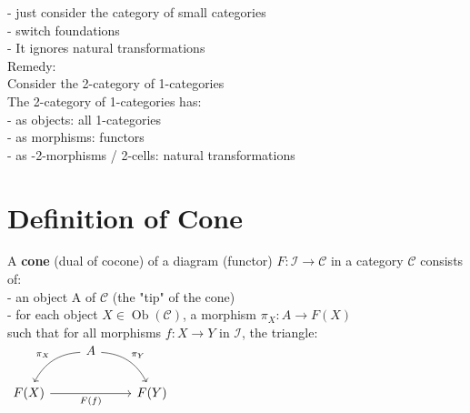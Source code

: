 \documentclass[a4paper, twoside, english, 11pt]{book}
\DeclareMathOperator{\Ob}{Ob}
\newcommand{\C}{\mathcal C}
\newcommand{\I}{\mathcal I}
\begin{document}
\indent\indent
- just consider the category of small categories \\

\indent\indent
- switch foundations \\

- It ignores natural transformations \\
\indent\indent
Remedy: \\
\indent\indent
Consider the 2-category of 1-categories \\

\indent\indent
The 2-category of 1-categories has: \\

\indent\indent\indent
- as objects: all 1-categories \\

\indent\indent\indent
- as morphisms: functors \\

\indent\indent\indent
- as -2-morphisms / 2-cells: natural transformations \\



\section{Definition of Cone}

A \textbf{cone} (dual of cocone) of a diagram (functor) $F : \I \rightarrow \C$ in a category $\C$ consists of: \\

- an object A of $\C$ (the "tip" of the cone) \\

- for each object $X \in \Ob(\C)$, a morphism $\pi_X : A \rightarrow F(X)$ \\

\noindent
such that for all morphisms $f: X \rightarrow Y$ in $\I$, the triangle: \\

$\begin{tikzcd}
                         & A \arrow[ld, "\pi_X"', bend right] \arrow[rd, "\pi_Y", bend left] &      \\
F(X) \arrow[rr, "F(f)"'] &                                                                   & F(Y)
\end{tikzcd}$ \\
\end{document}
